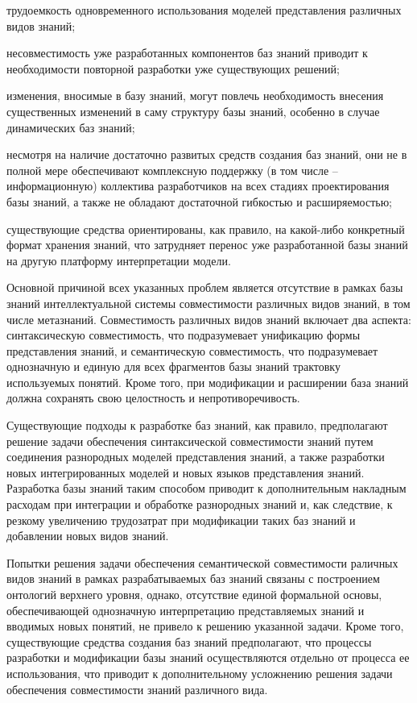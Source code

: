 \begin{SCn}
{\begin{scnitemize}
\item трудоемкость одновременного использования моделей представления различных видов знаний;
\item несовместимость уже разработанных компонентов баз знаний приводит к необходимости повторной разработки уже существующих решений;
\item изменения, вносимые в базу знаний, могут повлечь необходимость внесения существенных изменений в саму структуру базы знаний, особенно в случае динамических баз знаний;
\item несмотря на наличие достаточно развитых средств создания баз знаний, они не в полной мере обеспечивают комплексную поддержку (в том числе – информационную) коллектива разработчиков на всех стадиях проектирования базы знаний, а также не обладают достаточной гибкостью и расширяемостью;
\item существующие средства ориентированы, как правило, на какой-либо конкретный формат хранения знаний, что затрудняет перенос уже разработанной базы знаний на другую платформу интерпретации модели.
\end{scnitemize}

Основной причиной всех указанных проблем является отсутствие в рамках базы знаний интеллектуальной системы совместимости различных видов знаний, в том числе метазнаний. Совместимость различных видов знаний включает два аспекта: синтаксическую совместимость, что подразумевает унификацию формы представления знаний, и семантическую совместимость, что подразумевает однозначную и единую для всех фрагментов базы знаний трактовку используемых понятий. Кроме того, при модификации и расширении база знаний должна сохранять свою целостность и непротиворечивость.

Существующие подходы к разработке баз знаний, как правило, предполагают решение задачи обеспечения синтаксической совместимости знаний путем соединения разнородных моделей представления знаний, а также разработки новых интегрированных моделей и новых языков представления знаний. Разработка базы знаний таким способом приводит к дополнительным накладным расходам при интеграции и обработке разнородных знаний и, как следствие, к резкому увеличению трудозатрат при модификации таких баз знаний и добавлении новых видов знаний.

Попытки решения задачи обеспечения семантической совместимости раличных видов знаний в рамках разрабатываемых баз знаний связаны с построением онтологий верхнего уровня, однако, отсутствие единой формальной основы, обеспечивающей однозначную интерпретацию представляемых знаний и вводимых новых понятий, не привело к решению указанной задачи. Кроме того, существующие средства создания баз знаний предполагают, что процессы разработки и модификации базы знаний осуществляются отдельно от процесса ее использования, что приводит к дополнительному усложнению решения задачи обеспечения совместимости знаний различного вида.}



\scnendstruct

\end{SCn}